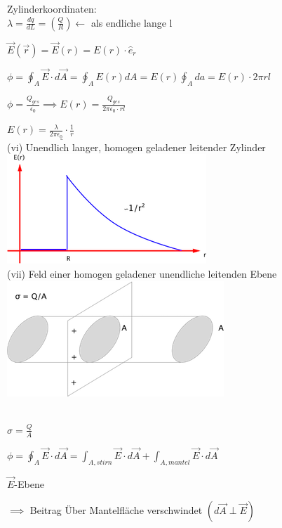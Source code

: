 \documentclass[11pt]{article}
\begin{document}
Zylinderkoordinaten:\\

$ \lambda=\frac{dq}{dL}=(\frac{Q}{R})\leftarrow $ als endliche lange l

$ \vec{E}(\vec{r})=\vec{E}(r)=E(r)\cdot\hat{e}_r $

$ \phi=\oint_{A}\vec{E}\cdot d\vec{A}=\oint_{A}E(r)dA=E(r)\oint_{A}da= E(r)\cdot 2\pi r l $

$ \phi=\frac{Q_{ges}}{\epsilon_0}\implies E(r)= \frac{Q_{ges}}{2\pi\epsilon_0\cdot rl} $

$ E(r)= \underline{ \frac{\lambda}{2\pi\epsilon_0}\cdot\frac{1}{r}}$\\

(vi) Unendlich langer, homogen geladener leitender Zylinder\\

\includegraphics{skizzen/14/14_6B9}\\

(vii) Feld einer homogen geladener unendliche leitenden Ebene\\

\includegraphics{skizzen/14/14_6BA}

\hfill\\

$ \sigma=\frac{Q}{A} $

$ \displaystyle\phi = \oint_{A}\vec{E}\cdot d\vec{A}=\int_{A, stirn}^{} \vec{E}\cdot d\vec{A}+\int_{A, mantel}^{} \vec{E}\cdot d\vec{A}   $

$ \vec{E} $-Ebene

$ \implies $ Beitrag Über Mantelfläche verschwindet $ (d\vec{A}\perp\vec{E}) $
\end{document}
